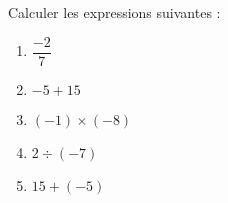 
\begin{exercice}\label{exosmath-0898}

    Calculer les expressions suivantes :
    \begin{multicols}{2}
        \begin{enumerate}
            \item
                \( \dfrac{ -2 }{ 7 }\)
            \item
                \( -5+15\)
            \item
                \( (-1)\times (-8)\)
            \item
                \( 2\div(-7)\)
            \item
                \( 15+(-5)\)
        \end{enumerate}
    \end{multicols}

\end{exercice}
